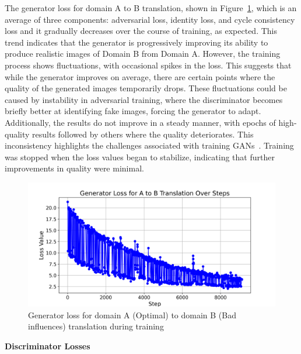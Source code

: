 \documentclass[12pt,DIV14,BCOR12mm,a4paper,footinclude=false,headinclude,parskip=half-,twoside,openright,cleardoublepage=empty,toc=index,bibliography=totoc,listof=totoc]{scrreprt}
\numberwithin{equation}{chapter}
\begin{document}
The generator loss for domain A to B translation, shown in Figure~\ref{g_loss}, which is an average of three components: adversarial loss, identity loss, and cycle consistency loss and it gradually decreases over the course of training, as expected. This trend indicates that the generator is progressively improving its ability to produce realistic images of Domain B from Domain A. However, the training process shows fluctuations, with occasional spikes in the loss. This suggests that while the generator improves on average, there are certain points where the quality of the generated images temporarily drops. These fluctuations could be caused by instability in adversarial training, where the discriminator becomes briefly better at identifying fake images, forcing the generator to adapt. Additionally, the results do not improve in a steady manner, with epochs of high-quality results followed by others where the quality deteriorates. This inconsistency highlights the challenges associated with training GANs~\cite{saxena2021generative}. Training was stopped when the loss values began to stabilize, indicating that further improvements in quality were minimal.
\begin{figure}
	\centering
	\includegraphics[scale=0.6]{../media/generator_loss.png}
	\caption{Generator loss for domain A (Optimal) to domain B (Bad influences) translation during training}
	\label{g_loss}
\end{figure}

\textbf{Discriminator Losses}
\end{document}
